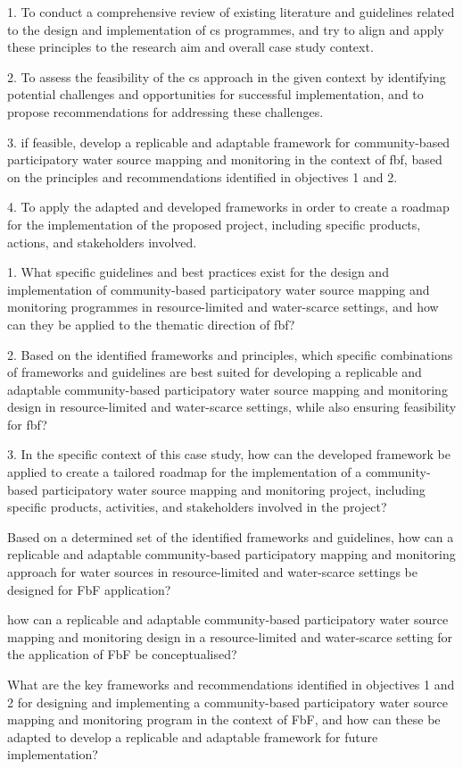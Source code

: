 1. To conduct a comprehensive review of existing literature and guidelines related to the design and implementation of \acrlong{cs} programmes, and try to align and apply these principles to the research aim and overall case study context.

2. To assess the feasibility of the \acrlong{cs} approach in the given context by identifying potential challenges and opportunities for successful implementation, and to propose recommendations for addressing these challenges.

3. if feasible, develop a replicable and adaptable framework for community-based participatory water source mapping and monitoring in the context of \acrlong{fbf}, based on the principles and recommendations identified in objectives 1 and 2.

4. To apply the adapted and developed frameworks in order to create a roadmap for the implementation of the proposed project, including specific products, actions, and stakeholders involved.

1. What specific guidelines and best practices exist for the design and implementation of community-based participatory water source mapping and monitoring programmes in resource-limited and water-scarce settings, and how can they be applied to the thematic direction of \acrlong{fbf}? %

2. Based on the identified frameworks and principles, which specific combinations of frameworks and guidelines are best suited for developing a replicable and adaptable community-based participatory water source mapping and monitoring design in resource-limited and water-scarce settings, while also ensuring feasibility for \acrlong{fbf}?

3. In the specific context of this case study, how can the developed framework be applied to create a tailored roadmap for the implementation of a community-based participatory water source mapping and monitoring project, including specific products, activities, and stakeholders involved in the project?




Based on a determined set of the identified frameworks and guidelines, how can a replicable and adaptable community-based participatory mapping and monitoring approach for water sources in resource-limited and water-scarce settings be designed for FbF application?

how can a replicable and adaptable community-based participatory water source mapping and monitoring design in a resource-limited and water-scarce setting for the application of FbF be conceptualised?


What are the key frameworks and recommendations identified in objectives 1 and 2 for designing and implementing a community-based participatory water source mapping and monitoring program in the context of FbF, and how can these be adapted to develop a replicable and adaptable framework for future implementation?


